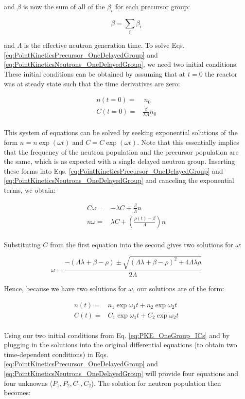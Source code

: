 \documentclass[10pt]{article}
\newcommand{\beq}{\begin{equation}}
\newcommand{\eeq}{\end{equation}}
\newcommand{\beqa}{\begin{equation}\begin{aligned}}
\newcommand{\eeqa}{\end{aligned}\end{equation}}
\numberwithin{equation}{section} %
\begin{document}
and \(\beta\) is now the sum of all of the \(\beta_i\) for each precursor group:

\beq
\beta=\sum_{i}\beta_i
\eeq

and \(\Lambda\) is the effective neutron generation time. To solve Eqs. \ref{eq:PointKineticsPrecursor_OneDelayedGroup} and \ref{eq:PointKineticsNeutrons_OneDelayedGroup}, we need two initial conditions. These initial conditions can be obtained by assuming that at \(t=0\) the reactor was at steady state such that the time derivatives are zero:

\beqa
\label{eq:PKE_OneGroup_ICs}
n(t=0)=&\ n_0\\
C(t=0)=&\frac{\beta}{\lambda\Lambda}n_0\\
\eeqa

This system of equations can be solved by seeking exponential solutions of the form \(n=n\exp(\omega t)\) and \(C=C\exp(\omega t)\). Note that this essentially implies that the frequency of the neutron population and the precursor population are the same, which is as expected with a single delayed neutron group. Inserting these forms into Eqs. \ref{eq:PointKineticsPrecursor_OneDelayedGroup} and \ref{eq:PointKineticsNeutrons_OneDelayedGroup} and canceling the exponential terms, we obtain:

\beqa
\label{eq:PKE_OneGroup_AssumedForm}
C\omega=&-\lambda C+\frac{\beta}{\Lambda}n\\
n\omega=&\lambda C+\left(\frac{\rho(t)-\beta}{\Lambda}\right)n\\
\eeqa

Substituting \(C\) from the first equation into the second gives two solutions for \(\omega\):  

\beq
\label{eq:PKEomega}
\omega=\frac{-(\Lambda\lambda+\beta-\rho)\pm\sqrt{(\Lambda\lambda+\beta-\rho)^2+4\Lambda\lambda\rho}}{2\Lambda}
\eeq

Hence, because we have two solutions for \(\omega\), our solutions are of the form:

\beqa
\label{eq:PKE_Solutions_OneGroup}
n(t)=&n_1\exp{\omega_1 t}+n_2\exp{\omega_2 t}\\
C(t)=&C_1\exp{\omega_1 t}+C_2\exp{\omega_2 t}\\
\eeqa 

Using our two initial conditions from Eq. \ref{eq:PKE_OneGroup_ICs} and by plugging in the solutions into the original differential equations (to obtain two time-dependent conditions) in Eqs. \ref{eq:PointKineticsPrecursor_OneDelayedGroup} and \ref{eq:PointKineticsNeutrons_OneDelayedGroup} will provide four equations and four unknowns (\(P_1, P_2, C_1, C_2\)). The solution for neutron population then becomes:
\end{document}

